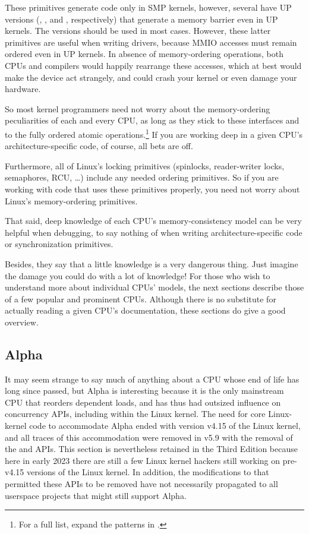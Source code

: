 These primitives generate code only in SMP kernels, however, several
have UP versions (, , and ,
respectively) that generate a memory barrier even in UP kernels.
The  versions should be used in most cases.
However, these latter primitives are useful when writing drivers,
because MMIO accesses must remain ordered even in UP kernels.
In absence of memory-ordering operations, both CPUs and compilers would
happily rearrange these accesses, which at best would make the device
act strangely, and could crash your kernel or even damage your hardware.

So most kernel programmers need not worry about the memory-ordering
peculiarities of each and every CPU, as long as they stick to these
interfaces and to the fully ordered atomic operations.\footnote{
	For a full list, expand the patterns in
	.}
If you are working deep in a given CPU's architecture-specific code,
of course, all bets are off.

Furthermore,
all of Linux's locking primitives (spinlocks, reader-writer locks,
semaphores, RCU, \ldots) include any needed ordering primitives.
So if you are working with code that uses these primitives properly,
you need not worry about Linux's memory-ordering primitives.

That said, deep knowledge of each CPU's memory-consistency model
can be very helpful when debugging, to say nothing of when writing
architecture-specific code or synchronization primitives.

Besides, they say that a little knowledge is a very dangerous thing.
Just imagine the damage you could do with a lot of knowledge!
For those who wish to understand more about individual CPUs'
 models, the next sections describe those of a few
popular and prominent CPUs.
Although there is no substitute for actually reading a given CPU's
documentation, these sections do give a good overview.

\subsection{Alpha}
\label{sec:memorder:Alpha}

It may seem strange to say much of anything about a CPU whose end of life
has long since passed, but Alpha is interesting because it is the only
mainstream CPU that reorders dependent loads, and has thus had outsized
influence on concurrency APIs, including within the Linux kernel.
The need for core Linux-kernel code to accommodate Alpha ended
with version v4.15 of the Linux kernel, and all traces of this
accommodation were removed in v5.9 with the removal of the
 and  APIs.
This section is nevertheless retained in the Third Edition
because here in early 2023 there are still a few Linux kernel hackers
still working on pre-v4.15 versions of the Linux kernel.
In addition, the modifications to  that permitted
these APIs to be removed have not necessarily propagated to all
userspace projects that might still support Alpha.

